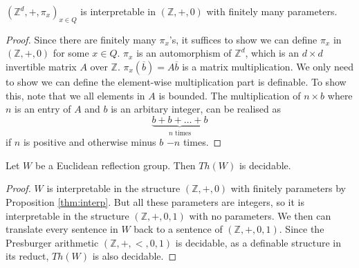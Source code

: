 \documentclass[../main.tex]{subfiles}
\begin{document}
\begin{lemma}
    $(\mathbb Z^d, +, \pi_x)_{x \in Q}$ is interpretable in $(\mathbb Z, +, 0)$ with finitely many parameters.
\end{lemma}

\begin{proof}
    Since there are finitely many $\pi_x$'s, it suffices to show we can define $\pi_x$ in $(\mathbb Z, +, 0)$ for some $x\in Q$. $\pi_x$ is an automorphism of $\mathbb Z^d$, which is an $d\times d$ invertible matrix $A$ over $\mathbb Z$.
    $\pi_x(\overline b)=A\overline b$ is a matrix multiplication. We only need to show we can define the element-wise multiplication part is definable. To show this, note that we all elements in $A$ is bounded. The multiplication of $n\times b$ where $n$ is an entry of $A$ and $b$ is an arbitary integer, can be realised as \[
    \underbrace{b+b+\dots+b}_\text{$n$ times}
    \]
    if $n$ is positive and otherwise minus $b$ $-n$ times.
\end{proof}

\begin{theorem}
    Let $W$ be a Euclidean reflection group. Then $Th(W)$ is decidable.
\end{theorem}

\begin{proof}
    $W$ is interpretable in the structure $(\mathbb Z, +, 0)$ with finitely parameters by Proposition \ref{thm:interp}. But all these parameters are integers, so it is interpretable in the structure $(\mathbb Z, +, 0,1)$ with no parameters. We then can translate every sentence in $W$ back to a sentence of $(\mathbb Z, +, 0,1)$. Since the Presburger arithmetic $(\mathbb Z, +, <,0,1)$ is decidable, as a definable structure in its reduct, $Th(W)$ is also decidable.
\end{proof}
\end{document}
